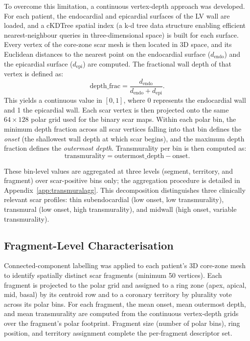 To overcome this limitation, a continuous vertex-depth approach was developed. For each
patient, the endocardial and epicardial surfaces of the LV wall are loaded, and a cKDTree
spatial index (a k-d tree data structure enabling efficient nearest-neighbour queries in
three-dimensional space) is built for each surface. Every vertex of the core-zone scar mesh
is then located in 3D space, and its Euclidean distances to the nearest point on the
endocardial surface ($d_\text{endo}$) and the epicardial surface ($d_\text{epi}$) are
computed. The fractional wall depth of that vertex is defined as:
\begin{equation}
    \text{depth\_frac} = \frac{d_\text{endo}}{d_\text{endo} + d_\text{epi}}.
    \label{eq:depthfrac}
\end{equation}
This yields a continuous value in $[0, 1]$, where 0 represents the endocardial wall and 1 the
epicardial wall. Each scar vertex is then projected onto the same $64 \times 128$ polar grid
used for the binary scar maps. Within each polar bin, the minimum depth fraction across all
scar vertices falling into that bin defines the \emph{onset} (the shallowest wall depth at which
scar begins), and the maximum depth fraction defines the \emph{outermost depth}.
Transmurality per bin is then computed as:
\begin{equation}
    \text{transmurality} = \text{outermost\_depth} - \text{onset}.
    \label{eq:transmurality}
\end{equation}

These bin-level values are aggregated at three levels (segment, territory, and fragment) over
scar-positive bins only; the aggregation procedure is detailed in
Appendix~\ref{app:transmuralagg}. This decomposition distinguishes three clinically
relevant scar profiles: thin subendocardial (low onset, low transmurality), transmural (low
onset, high transmurality), and midwall (high onset, variable transmurality).

\subsection{Fragment-Level Characterisation}
\label{sec:fragments}

Connected-component labelling was applied to each patient's 3D core-zone mesh to identify
spatially distinct scar fragments (minimum 50 vertices). Each fragment is projected to the
polar grid and assigned to a ring zone (apex, apical, mid, basal) by its centroid row and to a
coronary territory by plurality vote across its polar bins. For each fragment, the mean onset,
mean outermost depth, and mean transmurality are computed from the continuous
vertex-depth grids over the fragment's polar footprint. Fragment size (number of polar bins),
ring position, and territory assignment complete the per-fragment descriptor set.

